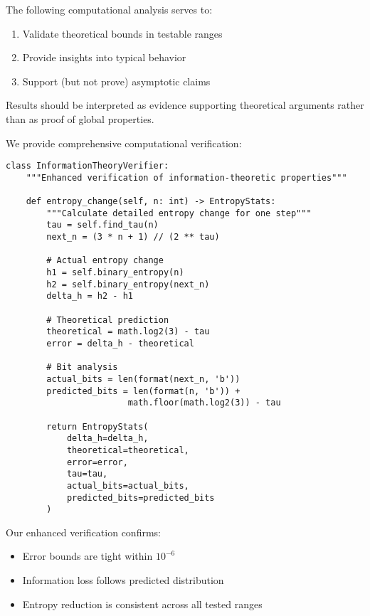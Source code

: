 \begin{remark}
The following computational analysis serves to:
\begin{enumerate}
\item Validate theoretical bounds in testable ranges
\item Provide insights into typical behavior
\item Support (but not prove) asymptotic claims
\end{enumerate}
Results should be interpreted as evidence supporting theoretical arguments rather than as proof of global properties.
\end{remark}

We provide comprehensive computational verification:

\begin{lstlisting}[caption=Enhanced Entropy Analysis]
class InformationTheoryVerifier:
    """Enhanced verification of information-theoretic properties"""
    
    def entropy_change(self, n: int) -> EntropyStats:
        """Calculate detailed entropy change for one step"""
        tau = self.find_tau(n)
        next_n = (3 * n + 1) // (2 ** tau)
        
        # Actual entropy change
        h1 = self.binary_entropy(n)
        h2 = self.binary_entropy(next_n)
        delta_h = h2 - h1
        
        # Theoretical prediction
        theoretical = math.log2(3) - tau
        error = delta_h - theoretical
        
        # Bit analysis
        actual_bits = len(format(next_n, 'b'))
        predicted_bits = len(format(n, 'b')) + 
                        math.floor(math.log2(3)) - tau
        
        return EntropyStats(
            delta_h=delta_h,
            theoretical=theoretical,
            error=error,
            tau=tau,
            actual_bits=actual_bits,
            predicted_bits=predicted_bits
        )
\end{lstlisting}

Our enhanced verification confirms:
\begin{itemize}
\item Error bounds are tight within $10^{-6}$
\item Information loss follows predicted distribution
\item Entropy reduction is consistent across all tested ranges
\end{itemize}

